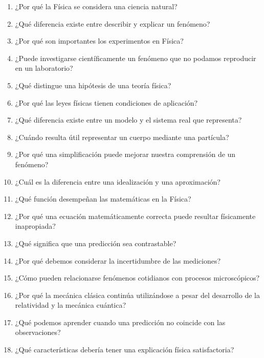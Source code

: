 \begin{enumerate}
    \item ¿Por qué la Física se considera una ciencia natural?
    \item ¿Qué diferencia existe entre describir y explicar un fenómeno?
    \item ¿Por qué son importantes los experimentos en Física?
    \item ¿Puede investigarse científicamente un fenómeno que no podamos reproducir en un laboratorio?
    \item ¿Qué distingue una hipótesis de una teoría física?
    \item ¿Por qué las leyes físicas tienen condiciones de aplicación?
    \item ¿Qué diferencia existe entre un modelo y el sistema real que representa?
    \item ¿Cuándo resulta útil representar un cuerpo mediante una partícula?
    \item ¿Por qué una simplificación puede mejorar nuestra comprensión de un fenómeno?
    \item ¿Cuál es la diferencia entre una idealización y una aproximación?
    \item ¿Qué función desempeñan las matemáticas en la Física?
    \item ¿Por qué una ecuación matemáticamente correcta puede resultar físicamente inapropiada?
    \item ¿Qué significa que una predicción sea contrastable?
    \item ¿Por qué debemos considerar la incertidumbre de las mediciones?
    \item ¿Cómo pueden relacionarse fenómenos cotidianos con procesos microscópicos?
    \item ¿Por qué la mecánica clásica continúa utilizándose a pesar del desarrollo de la relatividad y la mecánica cuántica?
    \item ¿Qué podemos aprender cuando una predicción no coincide con las observaciones?
    \item ¿Qué características debería tener una explicación física satisfactoria?
\end{enumerate}


